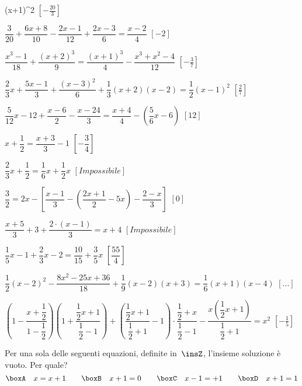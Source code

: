 \begin{esercizio}[\Ast]
\begin{enumeratea}
        \left(x+1\right)^{2}\)
  \hfill \(\left[-{\frac{20}{3}}\right]\)
 \item \(\dfrac{3}{20}+\dfrac{6x+8}{10}-\dfrac{2x-1}{12}+\dfrac{2x-3}{6}=
        \dfrac{x-2}{4}\)
  \hfill \(\left[-2\right]\)
 \item \(\dfrac{x^{3}-1}{18}+\dfrac{(x+2)^{3}}{9}=
        \dfrac{(x+1)^{3}}{4}-\dfrac{x^{3}+x^{2}-4}{12}\)
  \hfill \(\left[-{\frac{3}{7}}\right]\)
 \item \(\dfrac{2}{3}x+\dfrac{5x-1}{3}+\dfrac{(x-3)^{2}}{6}+
        \dfrac{1}{3}(x+2)(x-2)=\dfrac{1}{2}(x-1)^{2}\)
  \hfill \(\left[\frac{2}{7}\right]\)
 \item \(\dfrac{5}{12}x-12+\dfrac{x-6}{2}-\dfrac{x-24}{3}=
        \dfrac{x+4}{4}-\left(\dfrac{5}{6}x-6\right)\)
  \hfill \(\left[12\right]\)
 \item \(x+\dfrac{1}{2}=\dfrac{x+3}{3}-1\)
  \hfill \(\left[-\dfrac{3}{4}\right]\)
 \item \(\dfrac{2}{3}x+\dfrac{1}{2}=\dfrac{1}{6}x+\dfrac{1}{2}x\)
  \hfill \(\left[Impossibile\right]\)
 \item \(\dfrac{3}{2}=2x-\left[\dfrac{x-1}{3}-
        \left(\dfrac{2x+1}{2}-5x\right)-\dfrac{2-x}{3}\right]\)
  \hfill \(\left[0\right]\)
 \item \(\dfrac{x+5}{3}+3+\dfrac{2\cdot \left(x-1\right)}{3}=x+4\)
  \hfill \(\left[Impossibile\right]\)
 \item \(\dfrac{1}{5}x-1+\dfrac{2}{3}x-2=\dfrac{10}{15}+\dfrac{3}{5}x\)
  \hfill \(\left[\dfrac{55}{4}\right]\)
 \item \(\dfrac{1}{2}(x-2)^{2}-\dfrac{8x^{2}-25x+36}{18}+\dfrac{1}{9}(x-2)(x+3)=
        \dfrac{1}{6}(x+1)(x-4)\)
  \hfill \(\left[...\right]\)
 \item \(\left(1-\dfrac{x+\dfrac{1}{2}}{1-\dfrac{1}{2}}\right)
        \left(1+\dfrac{\dfrac{1}{2}x+1}{\dfrac{1}{2}-1}\right)+
        \left(\dfrac{\dfrac{1}{2}x+1}{\dfrac{1}{2}+1}-1\right)\cdot 
        {\dfrac{\dfrac{1}{2}+x}{\dfrac{1}{2}-1}}-
        \dfrac{x\left(\dfrac{1}{2}x+1\right)}{\dfrac{1}{2}+1}=x^{2}\)
  \hfill \(\left[-{\frac{1}{5}}\right]\)
\end{enumeratea}
\end{esercizio}

\begin{esercizio}
\label{ese:13.44}
Per una sola delle seguenti equazioni, definite in~\(\insZ\), l'insieme soluzione 
è vuoto. Per quale?
\[\boxA\quad x=x+1\qquad\boxB\quad x+1=0\qquad\boxC\quad x-1=+1\qquad\boxD\quad 
x+1=1\]
\end{esercizio}

